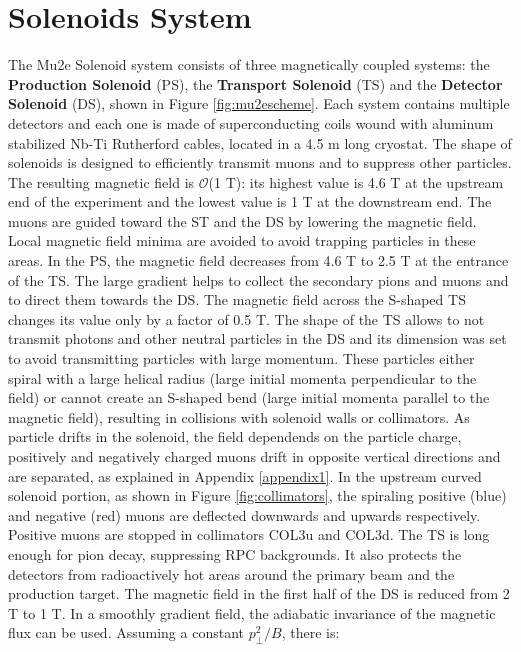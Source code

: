 \section{Solenoids System}
The Mu2e Solenoid system consists of three magnetically coupled systems: 
the \textbf{Production Solenoid} (PS), the \textbf{Transport Solenoid} (TS) 
and the \textbf{Detector Solenoid} (DS), shown in Figure \ref{fig:mu2escheme}. 
Each system contains multiple detectors and each one is made of superconducting 
coils wound with aluminum stabilized Nb-Ti Rutherford cables, located in a 4.5 m 
long cryostat. The shape of solenoids is designed to efficiently transmit muons 
and to suppress other particles. The resulting magnetic field is $\mathcal{O}$(1 T): 
its highest value is 4.6 T at the upstream end of the experiment and the lowest value 
is 1 T at the downstream end. 
The muons are guided toward the ST and the DS by lowering the magnetic field. 
Local magnetic field minima are avoided to avoid trapping particles in these areas. 
In the PS, the magnetic field decreases from 4.6 T to 2.5 T at the entrance of 
the TS. The large gradient helps to collect the secondary pions and muons and to 
direct them towards the DS. The magnetic field across the S-shaped TS changes its 
value only by a factor of 0.5 T. The shape of the TS allows to not transmit photons 
and other neutral particles in the DS and its dimension was set to avoid transmitting 
particles with large momentum. These particles either spiral with a large helical 
radius (large initial momenta perpendicular to the field) or cannot create an 
S-shaped bend (large initial momenta parallel to the magnetic field), resulting 
in collisions with solenoid walls or collimators. As particle drifts in the solenoid,  
the field dependends on the particle charge, positively and negatively charged muons 
drift in opposite vertical directions and are separated, as explained in Appendix 
\ref{appendix1}. In the upstream curved solenoid portion, as shown in Figure 
\ref{fig:collimators}, the spiraling positive (blue) and negative (red) muons 
are deflected downwards and upwards respectively. Positive muons are stopped in 
collimators COL3u and COL3d. The TS is long enough for pion decay, suppressing 
RPC backgrounds. It also protects the detectors from radioactively hot areas around 
the primary beam and the production target. The magnetic field in the first half of 
the DS is reduced from 2 T to 1 T. In a smoothly gradient field, the adiabatic 
invariance of the magnetic flux can be used. Assuming a constant $p^2_\perp/B$, there is:
